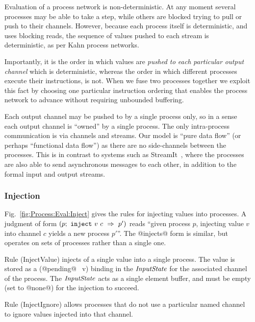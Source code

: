 Evaluation of a process network is non-deterministic. At any moment several processes may be able to take a step, while others are blocked trying to pull or push to their channels. However, because each process itself is deterministic, and uses blocking reads, the sequence of values pushed to each stream is deterministic, as per Kahn process networks. 

Importantly, it is the order in which values are \emph{pushed to each particular output channel} which is deterministic, whereas the order in which different processes execute their instructions, is not. When we fuse two processes together we exploit this fact by choosing one particular instruction ordering that enables the process network to advance without requiring unbounded buffering.

Each output channel may be pushed to by a single process only, so in a sense each output channel is ``owned'' by a single process. The only intra-process communication is via channels and streams. Our model is ``pure data flow'' (or perhaps ``functional data flow'') as there are no side-channels between the processes. This is in contrast to systems such as StreamIt~\cite{thies2002streamit}, where the processes are also able to send asynchronous messages to each other, in addition to the formal input and output streams.





\eject{}
\subsubsection{Injection}
Fig.~\ref{fig:Process:Eval:Inject} gives the rules for injecting values into processes. A judgment of form $(p;~\texttt{inject}~v~c~\Rightarrow~p')$ reads ``given process $p$, injecting value $v$ into channel $c$ yields a new process $p'$''. The @injects@ form is similar, but operates on sets of processes rather than a single one.

Rule (InjectValue) injects of a single value into a single process. The value is stored as a (@pending@~ v) binding in the $\textit{InputState}$ for the associated channel of the process. The $\textit{InputState}$ acts as a single element buffer, and must be empty (set to @none@) for the injection to succeed.

Rule (InjectIgnore) allows processes that do not use a particular named channel to ignore values injected into that channel.

